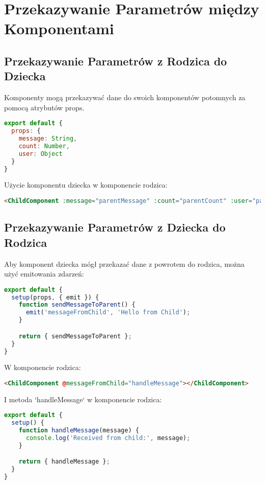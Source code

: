 \documentclass[a4paper,12pt]{article}
\begin{document}
\section{Przekazywanie Parametrów między Komponentami}

\subsection{Przekazywanie Parametrów z Rodzica do Dziecka}
Komponenty mogą przekazywać dane do swoich komponentów potomnych za pomocą atrybutów props.

\begin{lstlisting}[language=JavaScript]
export default {
  props: {
    message: String,
    count: Number,
    user: Object
  }
}
\end{lstlisting}

Użycie komponentu dziecka w komponencie rodzica:

\begin{lstlisting}[language=HTML]
<ChildComponent :message="parentMessage" :count="parentCount" :user="parentUser"></ChildComponent>
\end{lstlisting}

\subsection{Przekazywanie Parametrów z Dziecka do Rodzica}
Aby komponent dziecka mógł przekazać dane z powrotem do rodzica, można użyć emitowania zdarzeń:

\begin{lstlisting}[language=JavaScript]
export default {
  setup(props, { emit }) {
    function sendMessageToParent() {
      emit('messageFromChild', 'Hello from Child');
    }

    return { sendMessageToParent };
  }
}
\end{lstlisting}

W komponencie rodzica:

\begin{lstlisting}[language=HTML]
<ChildComponent @messageFromChild="handleMessage"></ChildComponent>
\end{lstlisting}

I metoda `handleMessage` w komponencie rodzica:

\begin{lstlisting}[language=JavaScript]
export default {
  setup() {
    function handleMessage(message) {
      console.log('Received from child:', message);
    }

    return { handleMessage };
  }
}
\end{lstlisting}
\end{document}
